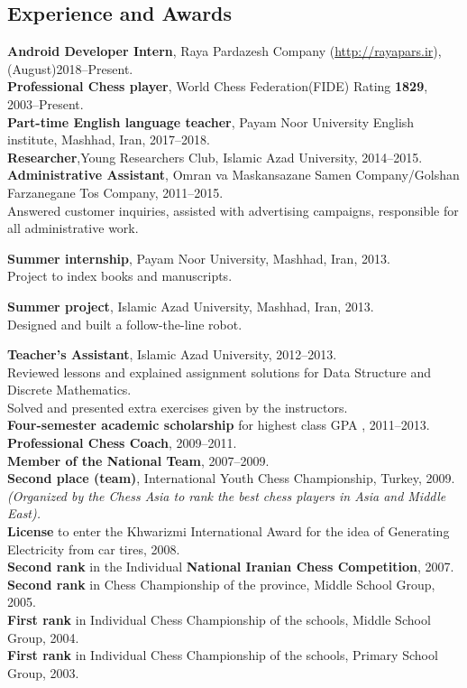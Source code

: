 \documentclass[10pt]{article}
\begin{document}
\subsection*{Experience and Awards}
\textbf {Android Developer Intern}, Raya Pardazesh Company (\url{http://rayapars.ir}), (August)2018--Present.\\
\noindent\textbf {Professional Chess player},  World Chess Federation(FIDE) Rating\textbf{ 1829}, 2003--Present.\\
\textbf {Part-time English language teacher}, Payam Noor University English institute, Mashhad, Iran, 2017--2018.\\
\noindent\textbf {Researcher},Young Researchers Club, Islamic Azad University, 2014--2015.\\
\noindent\textbf{Administrative Assistant}, Omran va Maskansazane Samen Company/Golshan Farzanegane Tos Company, 2011--2015.\\
\indent Answered customer inquiries, assisted with advertising campaigns, responsible for all administrative work.

\noindent\textbf{Summer internship}, Payam Noor University, Mashhad, Iran, 2013.\\
\indent Project to index books and manuscripts.

\noindent\textbf{Summer project}, Islamic Azad University, Mashhad, Iran, 2013.\\
\indent Designed and built a follow-the-line robot.

\noindent\textbf{Teacher’s Assistant}, Islamic Azad University, 2012--2013.\\
\indent Reviewed lessons and explained assignment solutions for Data Structure and Discrete Mathematics.\\
\indent Solved and presented extra exercises given by the instructors.\\
\textbf{Four-semester academic scholarship} for highest class GPA , 2011--2013.\\
\noindent\textbf {Professional Chess Coach}, 2009--2011.\\
\noindent\textbf {Member of the National Team}, 2007--2009.\\
\textbf{Second place (team)}, International Youth Chess Championship, Turkey, 2009.\\ \indent \textit {(Organized by the Chess Asia to rank the best chess players in Asia and Middle East).} \\
\noindent\textbf {License }to enter the Khwarizmi International Award for the idea of Generating Electricity from car tires, 2008.\\
\textbf{Second rank} in the Individual \textbf{National Iranian Chess Competition}, 2007.\\
\textbf{Second rank} in Chess Championship of the province, Middle School Group, 2005.\\
\textbf{First rank} in Individual Chess Championship of the schools, Middle School Group, 2004.\\
\textbf{First rank} in Individual Chess Championship of the schools, Primary School Group, 2003.
\end{document}
